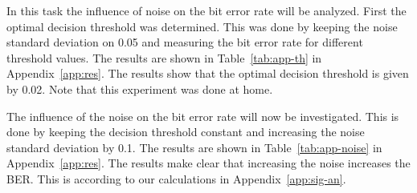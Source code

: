 \documentclass[11pt,titlepage]{report}
\begin{document}
In this task the influence of noise on the bit error rate will be analyzed. First the optimal decision threshold was determined. This was done by keeping the noise standard deviation on \num{0.05} and measuring the bit error rate for different threshold values. The results are shown in Table~\ref{tab:app-th} in Appendix~\ref{app:res}. The results show that the optimal decision threshold is given by \num{0.02}. Note that this experiment was done at home.

The influence of the noise on the bit error rate will now be investigated. This is done by keeping the decision threshold constant and increasing the noise standard deviation by \num{0.1}. The results are shown in Table~\ref{tab:app-noise} in Appendix~\ref{app:res}. The results make clear that increasing the noise increases the BER. This is according to our calculations in Appendix~\ref{app:sig-an}.
\end{document}
